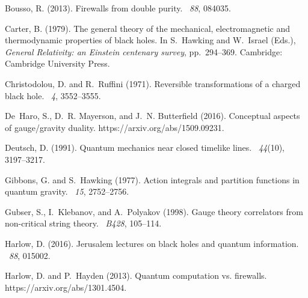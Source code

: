 \documentclass[12pt]{article}
\begin{document}
\begin{thebibliography}{}
Bousso, R. (2013).
\newblock Firewalls from double purity.
~{\em 88}, 084035.

Carter, B. (1979).
\newblock The general theory of the mechanical, electromagnetic and
  thermodynamic properties of black holes.
\newblock In S.~Hawking and W.~Israel (Eds.), {\em General Relativity: an
  {E}instein centenary survey}, pp.\  294--369. Cambridge: Cambridge University
  Press.

Christodolou, D. and R.~Ruffini (1971).
\newblock Reversible transformations of a charged black hole.
~{\em 4}, 3552--3555.

De~Haro, S., D.~R. Mayerson, and J.~N. Butterfield (2016).
\newblock Conceptual aspects of gauge/gravity duality.
\newblock https://arxiv.org/abs/1509.09231.

Deutsch, D. (1991).
\newblock Quantum mechanics near closed timelike lines.
~{\em 44\/}(10), 3197--3217.

Gibbons, G. and S.~Hawking (1977).
\newblock Action integrals and partition functions in quantum gravity.
~{\em 15}, 2752--2756.

Gubser, S., I.~Klebanov, and A.~Polyakov (1998).
\newblock Gauge theory correlators from non-critical string theory.
~{\em B428}, 105--114.

Harlow, D. (2016).
\newblock Jerusalem lectures on black holes and quantum information.
~{\em 88}, 015002.

Harlow, D. and P.~Hayden (2013).
\newblock Quantum computation vs. firewalls.
\newblock https://arxiv.org/abs/1301.4504.


\end{thebibliography}
\end{document}
